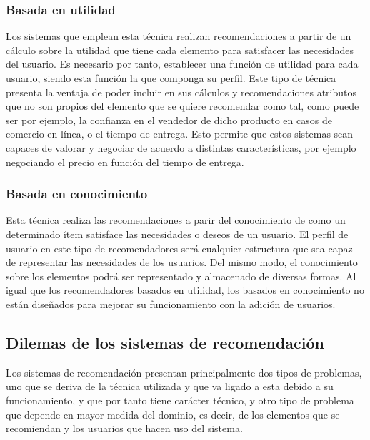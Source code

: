 \subsubsection{Basada en utilidad}
Los sistemas que emplean esta técnica realizan recomendaciones a partir de un cálculo sobre la utilidad que tiene cada elemento para satisfacer las necesidades del usuario. Es necesario por tanto, establecer una función de utilidad para cada usuario, siendo esta función la que componga su perfil. Este tipo de técnica presenta la ventaja de poder incluir en sus cálculos y recomendaciones atributos que no son propios del elemento que se quiere recomendar como tal, como puede ser por ejemplo, la confianza en el vendedor de dicho producto en casos de comercio en línea, o el tiempo de entrega. Esto permite que estos sistemas sean capaces de valorar y negociar de acuerdo a distintas características, por ejemplo negociando el precio en función del tiempo de entrega.

\subsubsection{Basada en conocimiento}
Esta técnica realiza las recomendaciones a parir del conocimiento de como un determinado ítem satisface las necesidades o deseos de un usuario. El perfil de usuario en este tipo de recomendadores será cualquier estructura que sea capaz de representar las necesidades de los usuarios. Del mismo modo, el conocimiento sobre los elementos podrá ser representado y almacenado de diversas formas. Al igual que los recomendadores basados en utilidad, los basados en conocimiento no están diseñados para mejorar su funcionamiento con la adición de usuarios.

\subsection{Dilemas de los sistemas de recomendación}
Los sistemas de recomendación presentan principalmente dos tipos de problemas, uno que se deriva de la técnica utilizada y que va ligado a esta debido a su funcionamiento, y que por tanto tiene carácter técnico, y otro tipo de problema que depende en mayor medida del dominio, es decir, de los elementos que se recomiendan y los usuarios que hacen uso del sistema.

